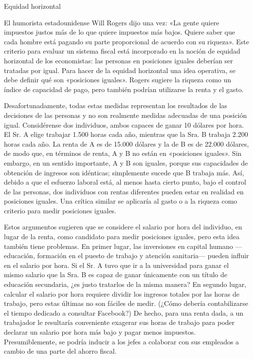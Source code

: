 \documentclass[10pt,a4paper]{article}
\begin{document}
Equidad horizontal

El humorista estadounidense Will Rogers dijo una vez: «La gente quiere impuestos justos más de lo que quiere impuestos más bajos. Quiere saber que cada hombre está pagando su parte proporcional de acuerdo con su riqueza». Este criterio para evaluar un sistema fiscal está incorporado en la noción de equidad horizontal de los economistas: las personas en posiciones iguales deberían ser tratadas por igual. Para hacer de la equidad horizontal una idea operativa, se debe definir qué son «posiciones iguales». Rogers sugiere la riqueza como un índice de capacidad de pago, pero también podrían utilizarse la renta y el gasto.

Desafortunadamente, todas estas medidas representan los resultados de las decisiones de las personas y no son realmente medidas adecuadas de una posición igual. Considérense dos individuos, ambos capaces de ganar 10 dólares por hora. El Sr. A elige trabajar 1.500 horas cada año, mientras que la Sra. B trabaja 2.200 horas cada año. La renta de A es de 15.000 dólares y la de B es de 22.000 dólares, de modo que, en términos de renta, A y B no están en «posiciones iguales». Sin embargo, en un sentido importante, A y B son iguales, porque sus capacidades de obtención de ingresos son idénticas; simplemente sucede que B trabaja más. Así, debido a que el esfuerzo laboral está, al menos hasta cierto punto, bajo el control de las personas, dos individuos con rentas diferentes pueden estar en realidad en posiciones iguales. Una crítica similar se aplicaría al gasto o a la riqueza como criterio para medir posiciones iguales.

Estos argumentos sugieren que se considere el salario por hora del individuo, en lugar de la renta, como candidato para medir posiciones iguales, pero esta idea también tiene problemas. En primer lugar, las inversiones en capital humano —educación, formación en el puesto de trabajo y atención sanitaria— pueden influir en el salario por hora. Si el Sr. A tuvo que ir a la universidad para ganar el mismo salario que la Sra. B es capaz de ganar únicamente con un título de educación secundaria, ¿es justo tratarlos de la misma manera? En segundo lugar, calcular el salario por hora requiere dividir los ingresos totales por las horas de trabajo, pero estas últimas no son fáciles de medir. (¿Cómo debería contabilizarse el tiempo dedicado a consultar Facebook?) De hecho, para una renta dada, a un trabajador le resultaría conveniente exagerar sus horas de trabajo para poder declarar un salario por hora más bajo y pagar menos impuestos. Presumiblemente, se podría inducir a los jefes a colaborar con sus empleados a cambio de una parte del ahorro fiscal.
\end{document}
